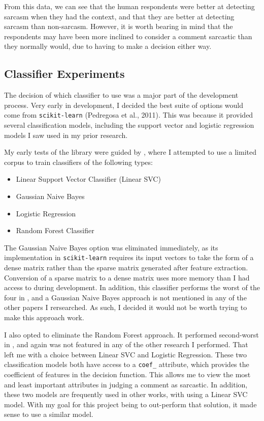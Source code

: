 \documentclass[a4paper,12pt]{article}
\begin{document}
From this data, we can see that the human respondents were better at detecting sarcasm when they had the context, and that they are better at detecting sarcasm than non-sarcasm. However, it is worth bearing in mind that the respondents may have been more inclined to consider a comment sarcastic than they normally would, due to having to make a decision either way.

\subsection{Classifier Experiments}
The decision of which classifier to use was a major part of the development process. Very early in development, I decided the best suite of options would come from \texttt{scikit-learn} (Pedregosa et al., 2011). This was because it provided several classification models, including the support vector and logistic regression models I saw used in my prior research.

My early tests of the library were guided by \cite{singhSarcasmDetectionStep2019}, where I attempted to use a limited corpus to train classifiers of the following types:
\begin{itemize}
  \item Linear Support Vector Classifier (Linear SVC)
  \item Gaussian Naive Bayes
  \item Logistic Regression
  \item Random Forest Classifier
\end{itemize}

The Gaussian Naive Bayes option was eliminated immediately, as its implementation in \texttt{scikit-learn} requires its input vectors to take the form of a dense matrix rather than the sparse matrix generated after feature extraction. Conversion of a sparse matrix to a dense matrix uses more memory than I had access to during development. In addition, this classifier performs the worst of the four in \cite{singhSarcasmDetectionStep2019}, and a Gaussian Naive Bayes approach is not mentioned in any of the other papers I rersearched. As such, I decided it would not be worth trying to make this approach work.

I also opted to eliminate the Random Forest approach. It performed second-worst in \cite{singhSarcasmDetectionStep2019}, and again was not featured in any of the other research I performed. That left me with a choice between Linear SVC and Logistic Regression. These two classification models both have access to a \texttt{coef\_} attribute, which provides the coefficient of features in the decision function. This allows me to view the most and least important attributes in judging a comment as sarcastic. In addition, these two models are frequently used in other works, with \cite{clicheSarcasmDetector2014} using a Linear SVC model. With my goal for this project being to out-perform that solution, it made sense to use a similar model.
\end{document}
